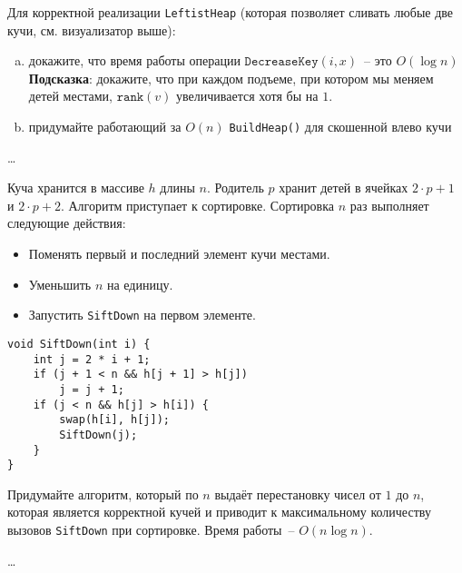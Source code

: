\begin{problem}
    Для корректной реализации \texttt{LeftistHeap} (которая позволяет сливать любые две кучи, см. визуализатор выше):
    \begin{enumerate}[a)]
        \item докажите, что время работы операции $\mathtt{DecreaseKey}(i, x)$~-- это $O(\log n)$ \\
            {
                \footnotesize \textbf{Подсказка}: докажите, что при каждом подъеме, при котором мы меняем детей местами,
                $\mathtt{rank}(v)$ увеличивается хотя бы на $1$.
            }
        \item придумайте работающий за $O(n)$ \texttt{BuildHeap()} для скошенной влево кучи
    \end{enumerate}
\end{problem}

\begin{solution}
    \dots
\end{solution}


\begin{problem}
    Куча хранится в массиве $h$ длины $n$. Родитель $p$ хранит детей в ячейках $2 \cdot p + 1$ и $2 \cdot p + 2$.
    Алгоритм приступает к сортировке. Сортировка $n$ раз выполняет следующие действия:
    \begin{itemize}
        \item Поменять первый и последний элемент кучи местами.
        \item Уменьшить $n$ на единицу.
        \item Запустить \texttt{SiftDown} на первом элементе.
    \end{itemize}

    {
        \normalfont\begin{lstlisting}
void SiftDown(int i) {
    int j = 2 * i + 1;
    if (j + 1 < n && h[j + 1] > h[j])
        j = j + 1;
    if (j < n && h[j] > h[i]) {
        swap(h[i], h[j]);
        SiftDown(j);
    }
}
        \end{lstlisting}
    }

    Придумайте алгоритм, который по $n$ выдаёт перестановку чисел от $1$ до $n$, которая является корректной кучей
    и приводит к максимальному количеству вызовов \texttt{SiftDown} при сортировке. Время работы~-- $O(n \log n)$.
\end{problem}

\begin{solution}
    \dots
\end{solution}


\clearpage
